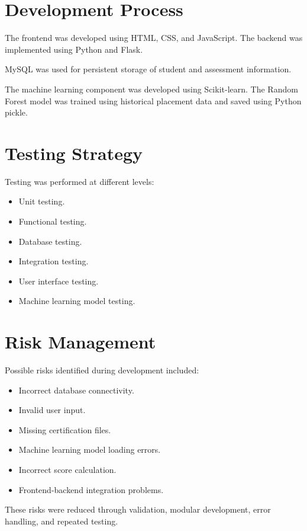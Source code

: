 \documentclass[12pt,a4paper]{report}
\begin{document}
\section{Development Process}

The frontend was developed using HTML, CSS, and JavaScript.
The backend was implemented using Python and Flask.

MySQL was used for persistent storage of student and assessment
information.

The machine learning component was developed using Scikit-learn.
The Random Forest model was trained using historical placement
data and saved using Python pickle.

\section{Testing Strategy}

Testing was performed at different levels:

\begin{itemize}
    \item Unit testing.
    \item Functional testing.
    \item Database testing.
    \item Integration testing.
    \item User interface testing.
    \item Machine learning model testing.
\end{itemize}

\section{Risk Management}

Possible risks identified during development included:

\begin{itemize}
    \item Incorrect database connectivity.
    \item Invalid user input.
    \item Missing certification files.
    \item Machine learning model loading errors.
    \item Incorrect score calculation.
    \item Frontend-backend integration problems.
\end{itemize}

These risks were reduced through validation, modular
development, error handling, and repeated testing.
\end{document}
